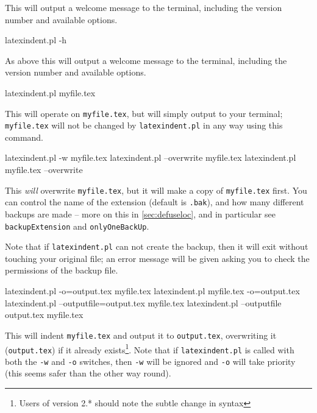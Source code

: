 	This will output a welcome message to the terminal, including the version number
	and available options.


	\begin{commandshell}
latexindent.pl -h
      \end{commandshell}

	As above this will output a welcome message to the terminal, including the version number
	and available options.
	\begin{commandshell}
latexindent.pl myfile.tex
      \end{commandshell}

	This will operate on \texttt{myfile.tex}, but will simply output to your terminal; \texttt{myfile.tex} will	not be changed
	by \texttt{latexindent.pl} in any way using this command.

	\begin{commandshell}
latexindent.pl -w myfile.tex
latexindent.pl --overwrite myfile.tex
latexindent.pl myfile.tex --overwrite 
      \end{commandshell}

	This \emph{will} overwrite \texttt{myfile.tex}, but it will
	make a copy of \texttt{myfile.tex} first. You can control the name of
	the extension (default is \texttt{.bak}), and how many different backups are made --
	more on this in \cref{sec:defuseloc}, and in particular see \texttt{backupExtension} and \texttt{onlyOneBackUp}.

	Note that if \texttt{latexindent.pl} can not create the backup, then it
	will exit without touching your original file; an error message will be given
	asking you to check the permissions of the backup file.

	\begin{commandshell} 
latexindent.pl -o=output.tex myfile.tex
latexindent.pl myfile.tex -o=output.tex 
latexindent.pl --outputfile=output.tex myfile.tex
latexindent.pl --outputfile output.tex myfile.tex
      \end{commandshell}

	This will indent \texttt{myfile.tex} and output it to \texttt{output.tex},
	overwriting it (\texttt{output.tex}) if it already exists\footnote{Users of version 2.* should
		note the subtle change in syntax}. Note that if \texttt{latexindent.pl} is called with both
	the \texttt{-w} and \texttt{-o} switches, then \texttt{-w} will
	be ignored and \texttt{-o} will take priority (this seems safer than the
	other way round).

